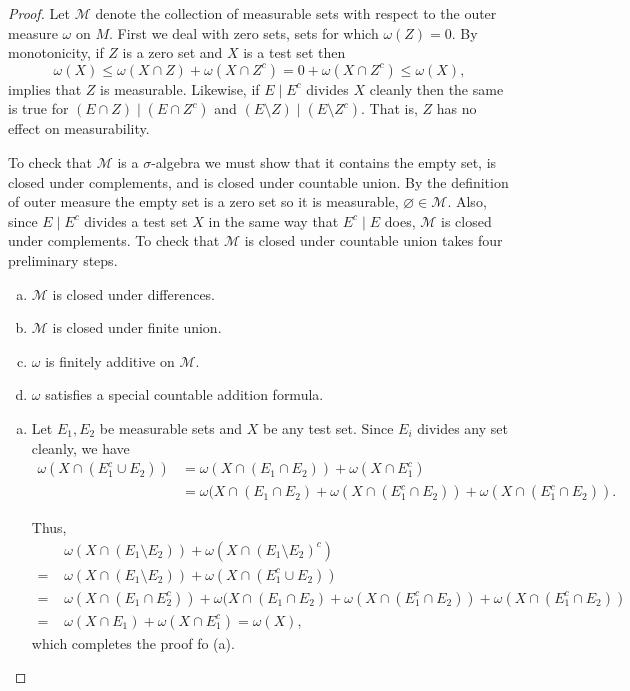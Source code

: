 \documentclass[11pt]{article}
\begin{document}
\begin{proof}
  Let $\mathcal{M}$ denote the collection of measurable sets with respect to the outer measure $\omega$ on $M$.  First we deal with zero sets, sets for which $\omega(Z)=0$.  By monotonicity, if $Z$ is a zero set and $X$ is a test set then
  \[
    \omega(X) \leqslant \omega(X \cap Z) + \omega(X \cap Z^c) = 0 + \omega(X \cap Z^c) \leqslant \omega(X),
  \]
  implies that $Z$ is measurable.  Likewise, if $E \mid E^c$ divides $X$ cleanly then the same is true for $(E \cap Z) \mid (E \cap Z^c)$ and $(E \setminus Z) \mid (E \setminus Z^c)$.  That is, $Z$ has no effect on measurability.

  To check that $\mathcal{M}$ is a $\sigma$-algebra we must show that it contains the empty set, is closed under complements, and is closed under countable union.  By the definition of outer measure the empty set is a zero set so it is measurable, $\varnothing \in \mathcal{M}$.  Also, since $E \mid E^c$ divides a test set $X$ in the same way that $E^c \mid E$ does, $\mathcal{M}$ is closed under complements.  To check that $\mathcal{M}$ is closed under countable union takes four preliminary steps.

  \begin{enumerate}[(a)]
    \item $\mathcal{M}$ is closed under differences.

    \item $\mathcal{M}$ is closed under finite union.

    \item $\omega$ is finitely additive on $\mathcal{M}$.

    \item $\omega$ satisfies a special countable addition formula.
  \end{enumerate}

  \begin{enumerate}[(a)]
    \item Let $E_1, E_2$ be measurable sets and $X$ be any test set.  Since $E_i$ divides any set cleanly, we have
      \begin{align*}
	\omega(X \cap (E_1^c \cup E_2)) &= \omega(X \cap (E_1 \cap E_2)) + \omega(X \cap E_1^c) \\
	&= \omega(X \cap (E_1 \cap E_2) + \omega(X \cap (E_1^c \cap E_2)) + \omega(X \cap (E_1^c \cap E_2)).
      \end{align*}

      Thus,
      \begin{align*}
	&\omega(X \cap (E_1 \setminus E_2)) + \omega(X \cap (E_1 \setminus E_2)^c) \\
	    = \,\, &\omega(X \cap (E_1 \setminus E_2)) + \omega(X \cap (E_1^c \cup E_2)) \\
	= \,\,&\omega(X \cap (E_1 \cap E_2^c)) + \omega(X \cap (E_1 \cap E_2) + \omega(X \cap (E_1^c \cap E_2)) + \omega(X \cap (E_1^c \cap E_2)) \\
	  = \,\,&\omega(X \cap E_1) + \omega(X \cap E_1^c) = \omega(X),
      \end{align*}
      which completes the proof fo (a).


\end{enumerate}
\end{proof}
\end{document}
